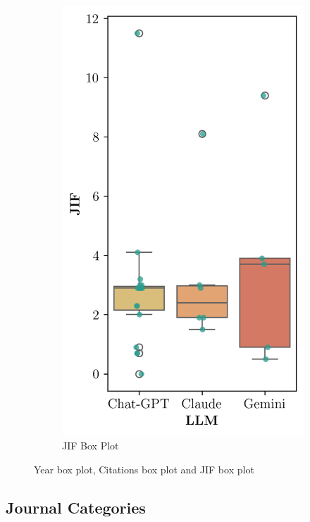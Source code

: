 \documentclass[runningheads]{llncs}
\begin{document}
\begin{figure}[htbp]
\begin{subfigure}[b]{0.32\textwidth}
        \includegraphics[width=\linewidth]{figures/jifs_box_plot.png}
        \caption{JIF Box Plot}
        \label{fig:jif_box_plot}
    \end{subfigure}
    
    \caption{Year box plot, Citations box plot and JIF box plot}
    \label{fig:grouped_figures}
\end{figure}

\subsection{Journal Categories}
\end{document}
